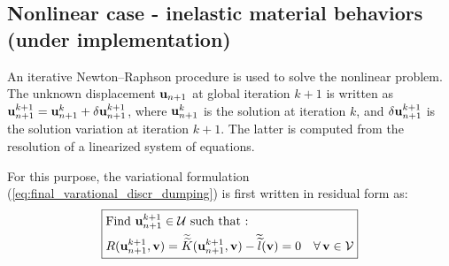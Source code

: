 \documentclass{report}
\newcommand{\bu}{\textbf{u}}
\newcommand{\bv}{\textbf{v}}
\def\bu{{\bf{u}}}
\def\bv{{\bf{v}}}
\begin{document}
\subsection{Nonlinear case - inelastic material behaviors (under implementation)}

An iterative Newton--Raphson procedure is used to solve the nonlinear
problem. The unknown displacement ${\bu_{n+1}}$ at global iteration
$k+1$ is written as ${\bu_{n+1}^{k+1}}={\bu_{n+1}^{k}}+\delta{\bu_{n+1}^{k+1}}$,
where ${\bu_{n+1}^{k}}$ is the solution at iteration $k$, and $\delta{\bu_{n+1}^{k+1}}$
is the solution variation at iteration $k+1$. The latter is computed
from the resolution of a linearized system of equations. 

For this purpose, the variational formulation (\ref{eq:final_varational_discr_dumping}) is first written in residual form as:
\begin{equation}
\boxed{\begin{aligned} & \text{Find \ensuremath{{\bu_{n+1}^{k+1}}\ensuremath{\in}\ensuremath{\mathcal{U}}} such that : }\\
 & R({\bu_{n+1}^{k+1}},\bv)=\widetilde{\widetilde{K}}(\bu_{n+1}^{k+1},\bv)-\widetilde{\widetilde{l}}(\bv)=0\quad\text{\ensuremath{\forall\,}}\bv\in\mathcal{V}
\end{aligned}
}
\end{equation}
\end{document}
